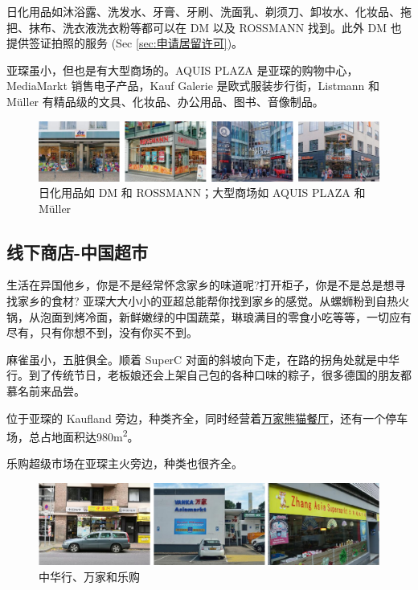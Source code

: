     日化用品如沐浴露、洗发水、牙膏、牙刷、洗面乳、剃须刀、卸妆水、化妆品、拖把、抹布、洗衣液洗衣粉等都可以在 DM 以及 ROSSMANN 找到。此外 DM 也提供签证拍照的服务 (Sec \ref{sec:申请居留许可})。

    亚琛虽小，但也是有大型商场的。AQUIS PLAZA 是亚琛的购物中心，MediaMarkt 销售电子产品，Kauf Galerie 是欧式服装步行街，Listmann 和 Müller 有精品级的文具、化妆品、办公用品、图书、音像制品。

    \begin{figure}[ht]
      \centering
      \includegraphics[width=\textwidth]{在亚琛学习和生活/日常消费和饮食/德国超市/日化用品如 DM 和 ROSSMANN；大型商场如 AQUIS PLAZA 和 Müller.png}
      \caption{日化用品如 DM 和 ROSSMANN；大型商场如 AQUIS PLAZA 和 Müller}
      \label{fig:日化用品如 DM 和 ROSSMANN；大型商场如 AQUIS PLAZA 和 Müller}
    \end{figure}

  \subsection{线下商店-中国超市}\label{subsec:线下商店-中国超市}

    生活在异国他乡，你是不是经常怀念家乡的味道呢?打开柜子，你是不是总是想寻找家乡的食材? 亚琛大大小小的亚超总能帮你找到家乡的感觉。从螺蛳粉到自热火锅，从泡面到烤冷面，新鲜嫩绿的中国蔬菜，琳琅满目的零食小吃等等，一切应有尽有，只有你想不到，没有你买不到。

    \href{http://www.sinostore.de/}{} 麻雀虽小，五脏俱全。顺着 SuperC 对面的斜坡向下走，在路的拐角处就是中华行。到了传统节日，老板娘还会上架自己包的各种口味的粽子，很多德国的朋友都慕名前来品尝。

    \href{https://homeasia.de/}{} 位于亚琛的 Kaufland 旁边，种类齐全，同时经营着\href{https://homeasia.de/panda-buffet/}{万家熊猫餐厅}，还有一个停车场，总占地面积达980m\textsuperscript{2}。

    乐购超级市场在亚琛主火旁边，种类也很齐全。

    \begin{figure}[ht]
      \centering
      \includegraphics[width=\textwidth]{在亚琛学习和生活/日常消费和饮食/中华行、万家和乐购.png}
      \caption{中华行、万家和乐购}
      \label{fig:中华行、万家和乐购}
    \end{figure}

